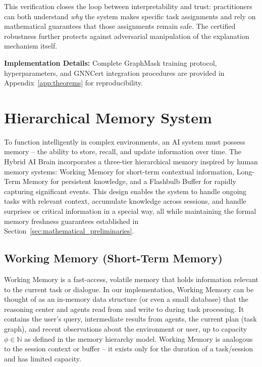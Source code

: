 \documentclass{article}
\begin{document}
This verification closes the loop between interpretability and trust: practitioners can both understand \emph{why} the system makes specific task assignments and rely on mathematical guarantees that those assignments remain safe. The certified robustness further protects against adversarial manipulation of the explanation mechanism itself.

\textbf{Implementation Details:} Complete GraphMask training protocol, hyperparameters, and GNNCert integration procedures are provided in Appendix~\ref{app:theorems} for reproducibility.



\section{Hierarchical Memory System}
\label{sec:hierarchical_memory}

To function intelligently in complex environments, an AI system must possess memory – the ability to store, recall, and update information over time. The Hybrid AI Brain incorporates a three-tier hierarchical memory inspired by human memory systems: Working Memory for short-term contextual information, Long-Term Memory for persistent knowledge, and a Flashbulb Buffer for rapidly capturing significant events. This design enables the system to handle ongoing tasks with relevant context, accumulate knowledge across sessions, and handle surprises or critical information in a special way, all while maintaining the formal memory freshness guarantees established in Section~\ref{sec:mathematical_preliminaries}.

\subsection{Working Memory (Short-Term Memory)}

Working Memory is a fast-access, volatile memory that holds information relevant to the current task or dialogue. In our implementation, Working Memory can be thought of as an in-memory data structure (or even a small database) that the reasoning center and agents read from and write to during task processing. It contains the user's query, intermediate results from agents, the current plan (task graph), and recent observations about the environment or user, up to capacity $\phi \in \mathbb{N}$ as defined in the memory hierarchy model. Working Memory is analogous to the session context or buffer – it exists only for the duration of a task/session and has limited capacity.
\end{document}
